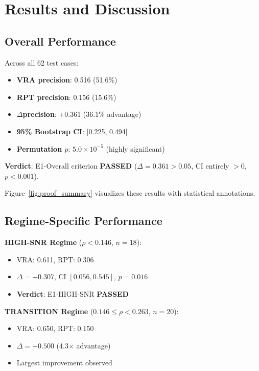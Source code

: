 \documentclass[conference]{IEEEtran}
\begin{document}

\section{Results and Discussion}

\subsection{Overall Performance}

Across all 62 test cases:
\begin{itemize}
    \item \textbf{VRA precision}: 0.516 (51.6\%)
    \item \textbf{RPT precision}: 0.156 (15.6\%)
    \item \textbf{$\Delta$precision}: +0.361 (36.1\% advantage)
    \item \textbf{95\% Bootstrap CI}: [0.225, 0.494]
    \item \textbf{Permutation $p$}: $5.0 \times 10^{-5}$ (highly significant)
\end{itemize}

\textbf{Verdict}: E1-Overall criterion \textbf{PASSED} ($\Delta = 0.361 > 0.05$, CI entirely $> 0$, $p < 0.001$).

Figure~\ref{fig:proof_summary} visualizes these results with statistical annotations.

\subsection{Regime-Specific Performance}

\textbf{HIGH-SNR Regime} ($\rho < 0.146$, $n=18$):
\begin{itemize}
    \item VRA: 0.611, RPT: 0.306
    \item $\Delta = +0.307$, CI $[0.056, 0.545]$, $p = 0.016$
    \item \textbf{Verdict}: E1-HIGH-SNR \textbf{PASSED}
\end{itemize}

\textbf{TRANSITION Regime} ($0.146 \leq \rho < 0.263$, $n=20$):
\begin{itemize}
    \item VRA: 0.650, RPT: 0.150
    \item $\Delta = +0.500$ (4.3$\times$ advantage)
    \item Largest improvement observed
\end{itemize}
\end{document}
